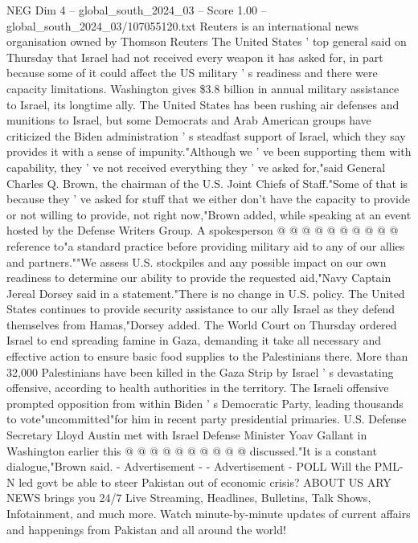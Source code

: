 \begin{textsample}{NEG Dim 4 – global\_south\_2024\_03 – Score 1.00 – global\_south\_2024\_03/107055120.txt}  \label{ex:f4_neg_351}
Reuters is an international news organisation owned by Thomson Reuters The United States ' top general said on Thursday that Israel had not received every weapon it has asked for, in part because some of it could affect the US military ' s readiness and there were capacity limitations.
Washington gives \$3.8 billion in annual military assistance to Israel, its longtime ally.
The United States has been rushing air defenses and munitions to Israel, but some Democrats and Arab American groups have criticized the Biden administration ' s steadfast support of Israel, which they say provides it with a sense of impunity."Although we ' ve been supporting them with capability, they ' ve not received everything they ' ve asked for,"said General Charles Q.
Brown, the chairman of the U.S.
Joint Chiefs of Staff."Some of that is because they ' ve asked for stuff that we either don't have the capacity to provide or not willing to provide, not right now,"Brown added, while speaking at an event hosted by the Defense Writers Group.
A spokesperson @ @ @ @ @ @ @ @ @ @ reference to"a standard practice before providing military aid to any of our allies and partners.""We assess U.S. stockpiles and any possible impact on our own readiness to determine our ability to provide the requested aid,"Navy Captain Jereal Dorsey said in a statement."There is no change in U.S. policy.
The United States continues to provide security assistance to our ally Israel as they defend themselves from Hamas,"Dorsey added.
The World Court on Thursday ordered Israel to end spreading famine in Gaza, demanding it take all necessary and effective action to ensure basic food supplies to the Palestinians there.
More than 32,000 Palestinians have been killed in the Gaza Strip by Israel ' s devastating offensive, according to health authorities in the territory.
The Israeli offensive prompted opposition from within Biden ' s Democratic Party, leading thousands to vote"uncommitted"for him in recent party presidential primaries.
U.S.
Defense Secretary Lloyd Austin met with Israel Defense Minister Yoav Gallant in Washington earlier this @ @ @ @ @ @ @ @ @ @ discussed."It is a constant dialogue,"Brown said. - Advertisement - - Advertisement - POLL Will the PML-N led govt be able to steer Pakistan out of economic crisis?
ABOUT US ARY NEWS brings you 24/7 Live Streaming, Headlines, Bulletins, Talk Shows, Infotainment, and much more.
Watch minute-by-minute updates of current affairs and happenings from Pakistan and all around the world!

\end{textsample}
